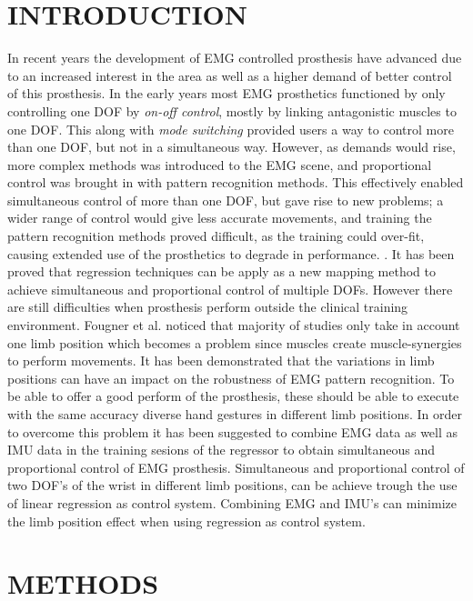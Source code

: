 \documentclass[a4paper, 10pt, conference]{ieeeconf}      %
\begin{document}
	\section{INTRODUCTION}
In recent years the development of EMG controlled prosthesis have advanced due to an increased interest in the area as well as a higher demand of better control of this prosthesis.\cite{fougner2012}
In the early years most EMG prosthetics functioned by only controlling one DOF by \textit{on-off control}, mostly by linking antagonistic muscles to one DOF. This along with \textit{mode switching} provided users a way to control more than one DOF, but not in a simultaneous way. However, as demands would rise, more complex methods was introduced to the EMG scene, and proportional control was brought in with pattern recognition methods. This effectively enabled simultaneous control of more than one DOF, but gave rise to new problems; a wider range of control would give less accurate movements, and training the pattern recognition methods proved difficult, as the training could over-fit, causing extended use of the prosthetics to degrade in performance. \cite{Ison2016}. It has been proved that regression techniques can be apply as a new mapping method to achieve simultaneous and proportional control of multiple DOFs\cite{hanhe2014}. However there are still difficulties when prosthesis perform outside the clinical training environment\cite{jiang2012}. Fougner et al.\cite{Fougner2011} noticed that majority of studies only take in account one limb position which becomes a problem since muscles create muscle-synergies to perform movements. It has been demonstrated that the variations in limb positions can have an impact on the robustness of EMG pattern recognition. To be able to offer a good perform of the prosthesis, these should be able to execute with the same accuracy diverse hand gestures in different limb positions. In order to overcome this problem it has been suggested to combine EMG data as well as IMU data in the training sesions of the regressor to obtain simultaneous and proportional control of EMG prosthesis. 
Simultaneous and proportional control of two  DOF's of the wrist in different limb positions, can be achieve trough the use of linear regression as control system. Combining EMG and IMU's can minimize the limb position effect when using regression as control system.	

	\section{METHODS}
	
\end{document}
